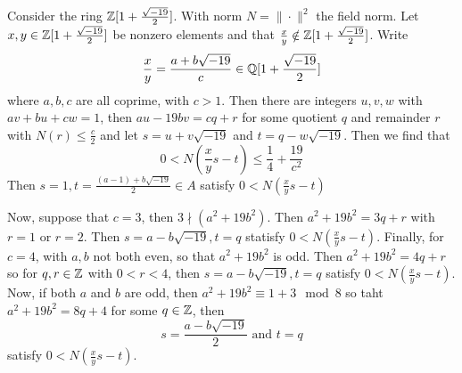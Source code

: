 \begin{example}\label{2.5}
    Consider the ring $\mathbb{Z}[1+\frac{\sqrt{-19}}{2}]$. With norm  $N=\|\cdot\|^2$
    the field norm. Let $x,y \in \mathbb{Z}[1+\frac{\sqrt{-19}}{2}]$ be nonzero elements
    and that $\frac{x}{y} \notin \mathbb{Z}[1+\frac{\sqrt{-19}}{2}]$. Write
    \begin{equation*}
        \frac{x}{y}=\frac{a+b\sqrt{-19}}{c} \in \mathbb{Q}[1+\frac{\sqrt{-19}}{2}]
    \end{equation*}
    where $a,b,c$ are all coprime, with  $c>1$. Then there are integers $u,v,w$
    with $av+bu+cw=1$, then  $au-19bv=cq+r$ for some quotient $q$ and remainder
    $r$ with  $N(r) \leq \frac{c}{2}$ and let $s=u+v\sqrt{-19}$ and
    $t=q-w\sqrt{-19}$. Then we find that
    \begin{equation*}
        0<N(\frac{x}{y}s-t) \leq \frac{1}{4}+\frac{19}{c^2}
    \end{equation*}
    Then $s=1, t=\frac{(a-1)+b\sqrt{-19}}{2} \in A$ satisfy $0<N(\frac{x}{y}s-t)$

    Now, suppose that $c=3$, then $3 \nmid (a^2+19b^2)$. Then $a^2+19b^2=3q+r$
    with  $r=1$ or $r=2$. Then $s=a-b\sqrt{-19},t=q$ statisfy
    $0<N(\frac{x}{y}s-t)$. Finally, for $c=4$, with $a,b$ not both even, so
    that $a^2+19b^2$ is odd. Then $a^2+19b^2=4q+r$ so for $q,r \in \mathbb{Z}$ with
    $0<r<4$, then $s=a-b\sqrt{-19}, t=q$ satisfy $0<N(\frac{x}{y}s-t)$. Now, if
    both $a$ and  $b$ are odd, then  $a^2+19b^2 \equiv 1+3 \mod{8}$ so taht
    $a^2+19b^2=8q+4$ for some  $q \in \mathbb{Z}$, then
    \begin{equation*}
        s=\frac{a-b\sqrt{-19}}{2} \text{ and } t=q
    \end{equation*}
    satisfy $0<N(\frac{x}{y}s-t)$.
\end{example}
